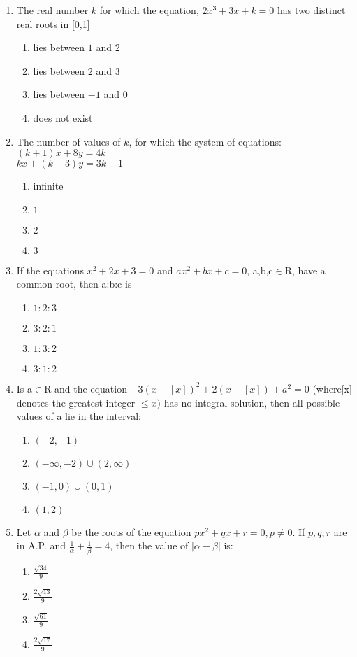 \begin{enumerate}[label=\arabic*.,ref=\thesubsection.\theenumi]
\item The real number $k$ for which the equation, $2x^3+3x+k=0$ has two distinct real roots in [0,1]
\begin{enumerate}
\item lies between $1$ and $2$
\item lies between $2$ and $3$
\item lies between $-1$ and $0$
\item does not exist 
\end{enumerate}

\item The number of values of $k$, for which the system of equations:\\
$(k+1)x+8y=4k$\\
$kx+(k+3)y=3k-1$
\begin{enumerate}
\item infinite
\item $1$
\item $2$
\item $3$
\end{enumerate}

\item If the equations $x^2+2x+3=0$ and $ax^2+bx+c=0$, a,b,c$\in$R, have a common root, then a:b:c is
\begin{enumerate}
\item $1:2:3$
\item $3:2:1$
\item $1:3:2$
\item $3:1:2$ 
\end{enumerate}

\item Is a$\in$R and the equation $-3(x-[x])^2+2(x-[x])+a^2=0$ 
(where[x] denotes the greatest integer $\leq{x})$ has no integral solution, then all possible values of a lie in the interval:
\begin{enumerate}
\item $(-2,-1)$
\item $(-\infty,-2)\cup(2,\infty)$
\item $(-1,0)\cup(0,1)$
\item $(1,2)$
\end{enumerate}

\item Let $\alpha$ and $\beta$ be the roots of the equation $px^2+qx+r=0,p\neq0$. If $p,q,r$ are in A.P. and $\frac{1}{\alpha}+\frac{1}{\beta}=4$, then the value of $|\alpha-\beta|$ is:
\begin{enumerate}
\item $\frac{\sqrt{34}}{9}$
\item $\frac{2\sqrt{13}}{9}$
\item $\frac{\sqrt{61}}{9}$
\item $\frac{2\sqrt{17}}{9}$
\end{enumerate}


\end{enumerate}
